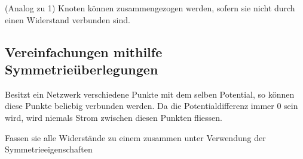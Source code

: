 										\iend
					\fix \fix
										\beginip
											(Analog zu 1) Knoten können zusammengezogen werden, sofern sie nicht durch einen Widerstand verbunden sind.
											\begin{center}

											\end{center}
										\iend

										\newpage


										\subsection{Vereinfachungen mithilfe Symmetrieüberlegungen}

										Besitzt ein Netzwerk verschiedene Punkte mit dem selben Potential, so können diese Punkte beliebig verbunden werden.
										Da die Potentialdifferenz immer 0 sein wird, wird niemals Strom zwischen diesen Punkten fliessen.

										\beginbsp
											Fassen sie alle Widerstände zu einem zusammen unter Verwendung der Symmetrieeigenschaften
											\begin{center}
											\end{center}
										\iend

